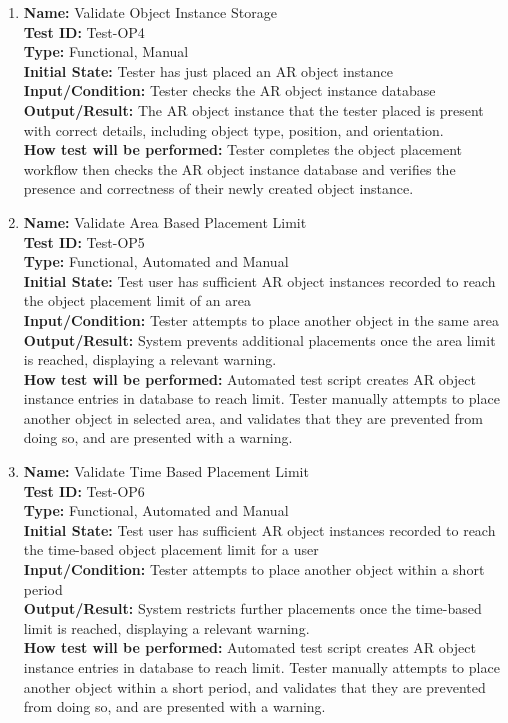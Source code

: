 \documentclass[12pt, titlepage]{article}
\begin{document}
\begin{enumerate}
  \item \textbf{Name:} Validate Object Instance Storage \label{itm:Test-OP4} \\
        \textbf{Test ID:} Test-OP4 \\
        \textbf{Type:} Functional, Manual \\
        \textbf{Initial State:} Tester has just placed an AR object instance \\
        \textbf{Input/Condition:} Tester checks the AR object instance database \\
        \textbf{Output/Result:} The AR object instance that the tester placed is present with correct details, including object type, position, and orientation. \\
        \textbf{How test will be performed:} Tester completes the object placement workflow then checks the AR object instance database and verifies the presence and correctness of their newly created object instance.
        
  \item \textbf{Name:} Validate Area Based Placement Limit \label{itm:Test-OP5} \\
        \textbf{Test ID:} Test-OP5 \\
        \textbf{Type:} Functional, Automated and Manual \\
        \textbf{Initial State:} Test user has sufficient AR object instances recorded to reach the object placement limit of an area  \\
        \textbf{Input/Condition:} Tester attempts to place another object in the same area \\
        \textbf{Output/Result:} System prevents additional placements once the area limit is reached, displaying a relevant warning. \\
        \textbf{How test will be performed:} Automated test script creates AR object instance entries in database to reach limit. Tester manually attempts to place another object in selected area, and validates that they are prevented from doing so, and are presented with a warning.

  \item \textbf{Name:} Validate Time Based Placement Limit \label{itm:Test-OP6} \\
        \textbf{Test ID:} Test-OP6 \\
        \textbf{Type:} Functional, Automated and Manual \\
        \textbf{Initial State:} Test user has sufficient AR object instances recorded to reach the time-based object placement limit for a user \\
        \textbf{Input/Condition:} Tester attempts to place another object within a short period \\
        \textbf{Output/Result:} System restricts further placements once the time-based limit is reached, displaying a relevant warning. \\
        \textbf{How test will be performed:} Automated test script creates AR object instance entries in database to reach limit. Tester manually attempts to place another object within a short period, and validates that they are prevented from doing so, and are presented with a warning.


\end{enumerate}
\end{document}
